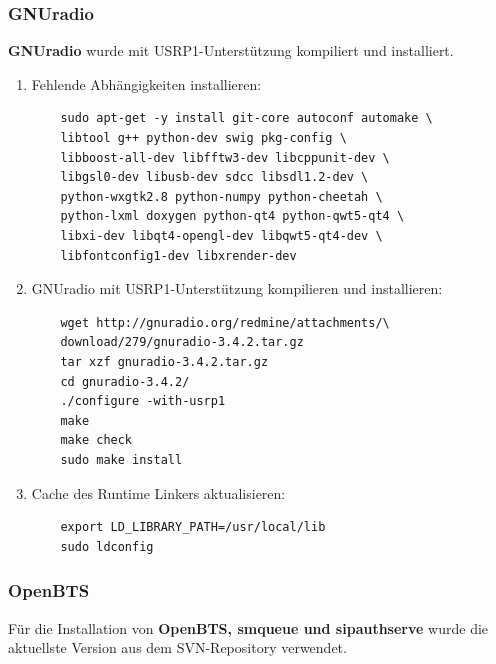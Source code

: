 \subsubsection{GNUradio}
\textbf{GNUradio} wurde mit USRP1-Unterstützung kompiliert und installiert. 

\begin{enumerate}
	\item Fehlende Abhängigkeiten installieren:
	\begin{verbatim}
	sudo apt-get -y install git-core autoconf automake \
	libtool g++ python-dev swig pkg-config \
	libboost-all-dev libfftw3-dev libcppunit-dev \
	libgsl0-dev libusb-dev sdcc libsdl1.2-dev \
	python-wxgtk2.8 python-numpy python-cheetah \
	python-lxml doxygen python-qt4 python-qwt5-qt4 \
	libxi-dev libqt4-opengl-dev libqwt5-qt4-dev \
	libfontconfig1-dev libxrender-dev
	\end{verbatim}
	\item GNUradio mit USRP1-Unterstützung kompilieren und installieren:
	\begin{verbatim}
	wget http://gnuradio.org/redmine/attachments/\
	download/279/gnuradio-3.4.2.tar.gz
	tar xzf gnuradio-3.4.2.tar.gz
	cd gnuradio-3.4.2/
	./configure -with-usrp1
	make
	make check
	sudo make install
	\end{verbatim}
	\item Cache des Runtime Linkers aktualisieren:
	\begin{verbatim}
	export LD_LIBRARY_PATH=/usr/local/lib
	sudo ldconfig	
	\end{verbatim}
\end{enumerate}
 
\subsubsection{OpenBTS}
Für die Installation von \textbf{OpenBTS, smqueue und sipauthserve} wurde die aktuellste Version aus dem SVN-Repository verwendet.

